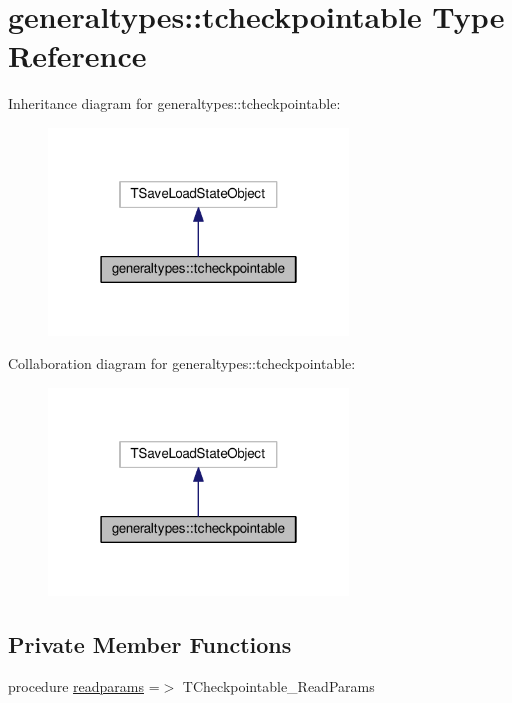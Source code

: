\hypertarget{structgeneraltypes_1_1tcheckpointable}{}\section{generaltypes\+:\+:tcheckpointable Type Reference}
\label{structgeneraltypes_1_1tcheckpointable}


Inheritance diagram for generaltypes\+:\+:tcheckpointable\+:
\nopagebreak
\begin{figure}[H]
\begin{center}
\leavevmode
\includegraphics[width=226pt]{structgeneraltypes_1_1tcheckpointable__inherit__graph}
\end{center}
\end{figure}


Collaboration diagram for generaltypes\+:\+:tcheckpointable\+:
\nopagebreak
\begin{figure}[H]
\begin{center}
\leavevmode
\includegraphics[width=226pt]{structgeneraltypes_1_1tcheckpointable__coll__graph}
\end{center}
\end{figure}
\subsection*{Private Member Functions}
\begin{DoxyCompactItemize}
\item 
procedure \mbox{\hyperlink{structgeneraltypes_1_1tcheckpointable_abe5c39c69555ec30baa7e4d103f27c57}{readparams}} =$>$ T\+Checkpointable\+\_\+\+Read\+Params
\end{DoxyCompactItemize}


